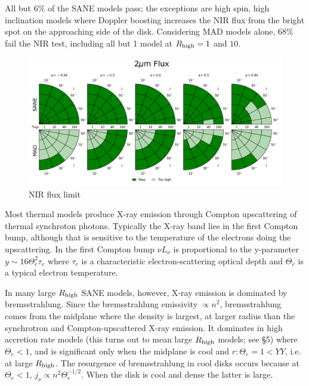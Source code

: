 All but $6\%$ of the SANE models pass; the exceptions are high spin, high inclination models where Doppler boosting increases the NIR flux from the bright spot on the approaching side of the disk.  Considering MAD models alone, $68\%$ fail the NIR test, including all but 1 model at $R_\mathrm{high} = 1$ and $10$.

\begin{figure}
  \centering
  \includegraphics[width=\columnwidth]{./figures/2um_flux_Constraints.png}
  \caption{NIR flux limit}
  \label{fig:cmp_2um_flux}
\end{figure}



Most thermal models produce X-ray emission through Compton upscattering of thermal synchroton photons.  Typically the X-ray band lies in the first Compton bump, although that is sensitive to the temperature of the electrons doing the upscattering.  In the first Compton bump $\nu L_\nu$ is proportional to the y-parameter $y \sim 16 \Theta_e^2 \tau_e$ where $\tau_e$ is a characteristic electron-scattering optical depth and $\Theta_e$ is a typical electron temperature.

In many large $R_\mathrm{high}$ SANE models, however, X-ray emission is dominated by bremsstrahlung.  Since the bremsstrahlung emissivity $\propto n^2$, bremsstrahlung comes from the midplane where the density is largest, at larger radius than the synchrotron and Compton-upscattered X-ray emission.  It dominates in high accretion rate models (this turns out to mean large $R_\mathrm{high}$ models; see \S 5) where $\Theta_e < 1$, and is significant only when the midplane is cool and $r: \Theta_e = 1 < YY$, i.e. at large $R_\mathrm{high}$.  The resurgence of bremsstrahlung in cool disks occurs because at $\Theta_e < 1$, $j_\nu \propto n^2 \Theta_e^{-1/2}$.  When the disk is cool and dense the latter is large.

